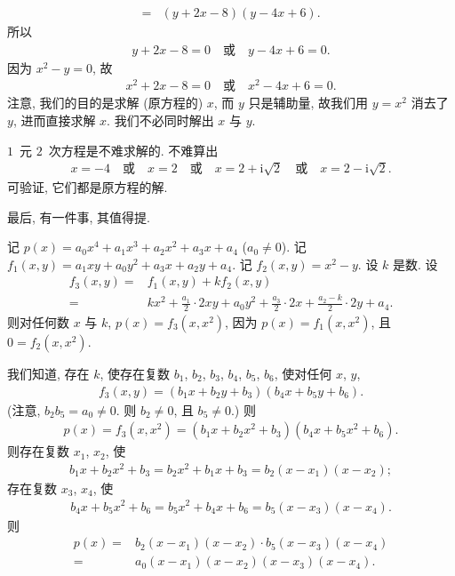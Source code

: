 \documentclass[../libro.tex]{subfiles}
\begin{document}
\begin{example}
\begin{align*}
        = {} & (y + 2x - 8) (y - 4x + 6).
    \end{align*}
    所以
    \begin{align*}
        y + 2x - 8 = 0
        \quad \text{或} \quad
        y - 4x + 6 = 0.
    \end{align*}
    因为 \(x^2 - y = 0\),
    故
    \begin{align*}
        x^2 + 2x - 8 = 0
        \quad \text{或} \quad
        x^2 - 4x + 6 = 0.
    \end{align*}
    注意,
    我们的目的是求解 (原方程的) \(x\),
    而 \(y\) 只是辅助量,
    故我们用 \(y = x^2\) 消去了 \(y\),
    进而直接求解 \(x\).
    我们不必同时解出 \(x\) 与 \(y\).

    \(1\)~元 \(2\)~次方程是不难求解的.
    不难算出
    \begin{align*}
        x = -4
        \quad \text{或} \quad
        x = 2
        \quad \text{或} \quad
        x = 2 + \mathrm{i} \sqrt{2}
        \quad \text{或} \quad
        x = 2 - \mathrm{i} \sqrt{2}.
    \end{align*}
    可验证, 它们都是原方程的解.
\end{example}

最后, 有一件事, 其值得提.

记 \(p (x) = a_0 x^4 + a_1 x^3 + a_2 x^2 + a_3 x + a_4\)
(\(a_0 \neq 0\)).
记 \(f_1 (x, y) = a_1 x y + a_0 y^2 + a_3 x + a_2 y + a_4\).
记 \(f_2 (x, y) = x^2 - y\).
设 \(k\) 是数.
设
\begin{align*}
    f_3 (x, y)
    = {} &
    f_1 (x, y) + k f_2 (x, y)
    \\
    = {} &
    k x^2
    + \frac{a_1}{2} \cdot 2xy
    + a_0 y^2
    + \frac{a_3}{2} \cdot 2x
    + \frac{a_2 - k}{2} \cdot 2y
    + a_4.
\end{align*}
则对任何数 \(x\) 与 \(k\),
\(p(x) = f_3 (x, x^2)\),
因为 \(p(x) = f_1 (x, x^2)\),
且 \(0 = f_2 (x, x^2)\).

我们知道,
存在 \(k\),
使存在复数
\(b_1\), \(b_2\), \(b_3\), \(b_4\), \(b_5\), \(b_6\),
使对任何 \(x\), \(y\),
\begin{align*}
    f_3 (x, y)
    = (b_1 x + b_2 y + b_3) (b_4 x + b_5 y + b_6).
\end{align*}
(注意, \(b_2 b_5 = a_0 \neq 0\).
则 \(b_2 \neq 0\), 且 \(b_5 \neq 0\).)
则
\begin{align*}
    p(x) = f_3 (x, x^2)
    = (b_1 x + b_2 x^2 + b_3) (b_4 x + b_5 x^2 + b_6).
\end{align*}
则存在复数 \(x_1\), \(x_2\), 使
\begin{align*}
    b_1 x + b_2 x^2 + b_3
    = b_2 x^2 + b_1 x + b_3
    = b_2 (x - x_1) (x - x_2);
\end{align*}
存在复数 \(x_3\), \(x_4\), 使
\begin{align*}
    b_4 x + b_5 x^2 + b_6
    = b_5 x^2 + b_4 x + b_6
    = b_5 (x - x_3) (x - x_4).
\end{align*}
则
\begin{align*}
    p(x)
    = {} &
    b_2 (x - x_1) (x - x_2)
    \cdot b_5 (x - x_3) (x - x_4)
    \\
    = {} &
    a_0 (x - x_1) (x - x_2) (x - x_3) (x - x_4).
\end{align*}
\end{document}
